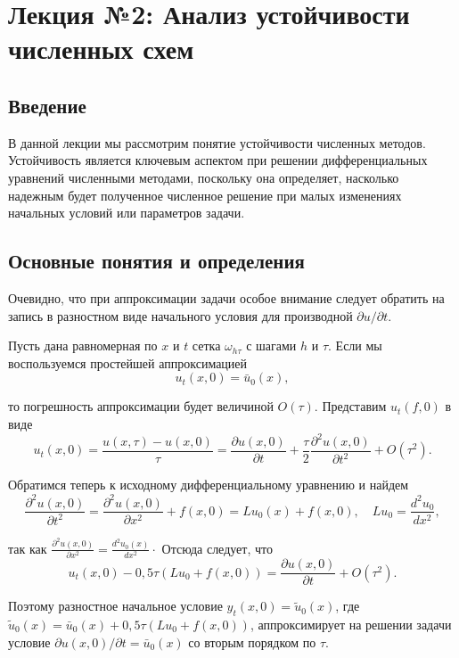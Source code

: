 \section*{Лекция №2: Анализ устойчивости численных схем}

\subsection*{Введение}

В данной лекции мы рассмотрим понятие устойчивости численных методов. Устойчивость является ключевым аспектом при решении дифференциальных уравнений численными методами, поскольку она определяет, насколько надежным будет полученное численное решение при малых изменениях начальных условий или параметров задачи.

\subsection*{Основные понятия и определения}


Очевидно, что при аппроксимации задачи особое внимание следует обратить на запись в разностном виде начального условия для производной $\partial u / \partial t$.

Пусть дана равномерная по $x$ и $t$ сетка $\omega_{h \tau}$ с шагами $h$ и $\tau$. Если мы воспользуемся простейшей аппроксимацией
$$
u_t(x, 0)=\bar{u}_0(x),
$$

то погрешность аппроксимации будет величиной $O(\tau)$. Представим $u_t(f, 0)$ в виде
$$
u_t(x, 0)=\frac{u(x, \tau)-u(x, 0)}{\tau}=\frac{\partial u(x, 0)}{\partial t}+\frac{\tau}{2} \frac{\partial^2 u(x, 0)}{\partial t^2}+O\left(\tau^2\right) .
$$

Обратимся теперь к исходному дифференциальному уравнению и найдем
$$
\frac{\partial^2 u(x, 0)}{\partial t^2}=\frac{\partial^2 u(x, 0)}{\partial x^2}+f(x, 0)=L u_0(x)+f(x, 0), \quad L u_0=\frac{d^2 u_0}{d x^2},
$$

так как $\frac{\partial^2 u(x, 0)}{\partial x^2}=\frac{d^2 u_0(x)}{d x^2} \cdot$ Отсюда следует, что
$$
u_t(x, 0)-0,5 \tau\left(L u_0+f(x, 0)\right)=\frac{\partial u(x, 0)}{\partial t}+O\left(\tau^2\right) .
$$

Поэтому разностное начальное условие $y_t(x, 0)=\tilde{u}_0(x)$, где $\tilde{u}_0(x)=\bar{u}_0(x)+0,5 \tau\left(L u_0+f(x, 0)\right)$, аппроксимирует на решении задачи условие $\partial u(x, 0) / \partial t=\bar{u}_0(x)$ со вторым порядком по $\tau$.

